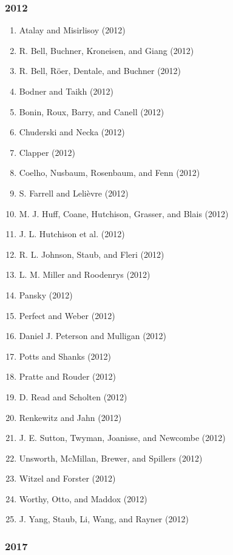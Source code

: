 \documentclass[english,man]{apa6}
\providecommand{\tightlist}{%
  \setlength{\itemsep}{0pt}\setlength{\parskip}{0pt}}
\theoremstyle{definition}
\theoremstyle{definition}
\theoremstyle{definition}
\theoremstyle{remark}
\begin{document}
\subsubsection{2012}\label{section-6}

\begin{enumerate}
\def\labelenumi{\arabic{enumi})}
\tightlist
\item
  Atalay and Misirlisoy (2012)
\item
  R. Bell, Buchner, Kroneisen, and Giang (2012)
\item
  R. Bell, Röer, Dentale, and Buchner (2012)
\item
  Bodner and Taikh (2012)
\item
  Bonin, Roux, Barry, and Canell (2012)
\item
  Chuderski and Necka (2012)
\item
  Clapper (2012)
\item
  Coelho, Nusbaum, Rosenbaum, and Fenn (2012)
\item
  S. Farrell and Lelièvre (2012)
\item
  M. J. Huff, Coane, Hutchison, Grasser, and Blais (2012)
\item
  J. L. Hutchison et al. (2012)
\item
  R. L. Johnson, Staub, and Fleri (2012)
\item
  L. M. Miller and Roodenrys (2012)
\item
  Pansky (2012)
\item
  Perfect and Weber (2012)
\item
  Daniel J. Peterson and Mulligan (2012)
\item
  Potts and Shanks (2012)
\item
  Pratte and Rouder (2012)
\item
  D. Read and Scholten (2012)
\item
  Renkewitz and Jahn (2012)
\item
  J. E. Sutton, Twyman, Joanisse, and Newcombe (2012)
\item
  Unsworth, McMillan, Brewer, and Spillers (2012)
\item
  Witzel and Forster (2012)
\item
  Worthy, Otto, and Maddox (2012)
\item
  J. Yang, Staub, Li, Wang, and Rayner (2012)
\end{enumerate}

\subsubsection{2017}\label{section-7}
\end{document}
